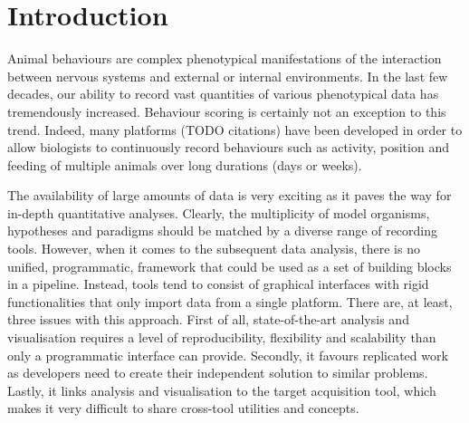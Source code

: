 \documentclass[10pt,letterpaper]{article}\usepackage[]{graphicx}\usepackage[]{color}
\begin{document}

\linenumbers

\section*{Introduction}

Animal behaviours are complex phenotypical manifestations of the interaction between nervous systems and external or internal environments.
In the last few decades, our ability to record vast quantities of various phenotypical data has tremendously increased.
Behaviour scoring is certainly not an exception to this trend.
Indeed, many platforms (TODO citations) have been developed in order to allow biologists to continuously record behaviours such as activity, position and feeding of multiple animals over long durations (days or weeks).

The availability of large amounts of data is very exciting as it paves the way for in-depth quantitative analyses.
Clearly, the multiplicity of model organisms, hypotheses and paradigms should be matched by a diverse range of recording tools.
However, when it comes to the subsequent data analysis, there is no unified, programmatic, framework that could be used as a set of building blocks in a pipeline.
Instead, tools tend to consist of graphical interfaces with rigid functionalities that only import data from a single platform.
There are, at least, three issues with this approach.
First of all, state-of-the-art analysis and visualisation requires a level of reproducibility, flexibility and scalability than only a programmatic interface can provide.
Secondly, it favours replicated work as developers need to create their independent solution to similar problems.
Lastly, it links analysis and visualisation to the target acquisition tool, which makes it very difficult to share cross-tool utilities and concepts.
\end{document}

